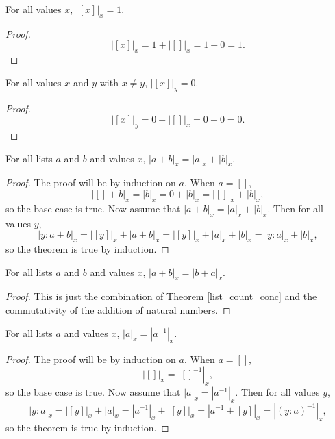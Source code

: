 \documentclass[../../math.tex]{subfiles}
\begin{document}
\begin{theorem}
    For all values $x$, $|[x]|_x = 1$.
\end{theorem}
\begin{proof}
    \[
        |[x]|_x = 1 + |[]|_x = 1 + 0 = 1.
    \]
\end{proof}

\begin{theorem}
    For all values $x$ and $y$ with $x \neq y$, $|[x]|_y = 0$.
\end{theorem}
\begin{proof}
    \[
        |[x]|_y = 0 + |[]|_x = 0 + 0 = 0.
    \]
\end{proof}

\begin{theorem} \label{list_count_conc}
    For all lists $a$ and $b$ and values $x$, $|a + b|_x = |a|_x + |b|_x$.
\end{theorem}
\begin{proof}
    The proof will be by induction on $a$.  When $a = []$,
    \[
        |[] + b|_x = |b|_x = 0 + |b|_x = |[]|_x + |b|_x,
    \]
    so the base case is true.  Now assume that $|a + b|_x = |a|_x + |b|_x$.
    Then for all values $y$,
    \[
        |y : a + b|_x = |[y]|_x + |a + b|_x = |[y]|_x + |a|_x + |b|_x
        = |y : a|_x + |b|_x,
    \]
    so the theorem is true by induction.
\end{proof}

\begin{theorem} \label{list_count_comm}
    For all lists $a$ and $b$ and values $x$, $|a + b|_x = |b + a|_x$.
\end{theorem}
\begin{proof}
    This is just the combination of Theorem \ref{list_count_conc} and the
    commutativity of the addition of natural numbers.
\end{proof}

\begin{theorem} \label{list_count_reverse}
    For all lists $a$ and values $x$, $|a|_x = |a^{-1}|_x$.
\end{theorem}
\begin{proof}
    The proof will be by induction on $a$.  When $a = []$,
    \[
        |[]|_x = |[]^{-1}|_x,
    \]
    so the base case is true.  Now assume that $|a|_x = |a^{-1}|_x$.  Then for
    all values $y$,
    \[
        |y : a|_x = |[y]|_x + |a|_x = |a^{-1}|_x + |[y]|_x = |a^{-1} + [y]|_x
        = |(y : a)^{-1}|_x,
    \]
    so the theorem is true by induction.
\end{proof}
\end{document}
